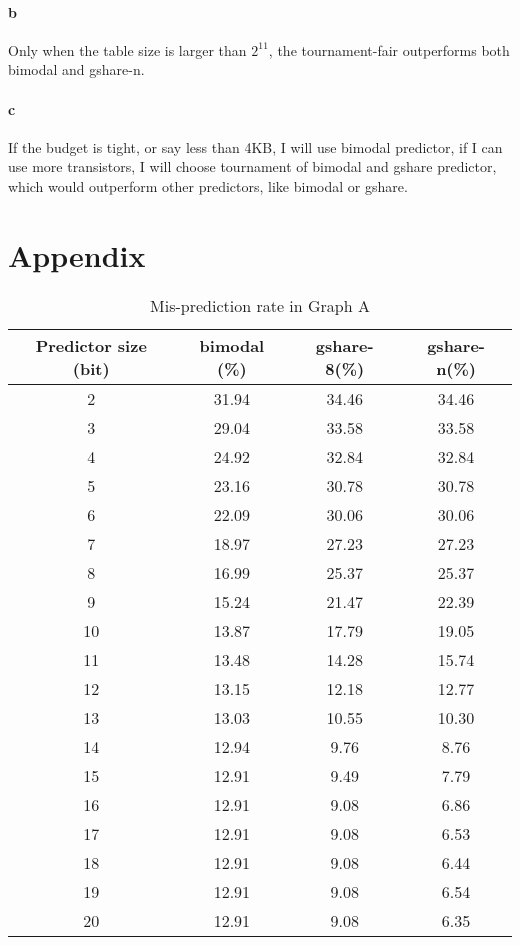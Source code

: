 \documentclass[12pt,letterpaper]{article}
\begin{document}
\paragraph*{b}
Only when the table size is larger than $2^{11}$, the tournament-fair 
outperforms both bimodal and gshare-n.

\paragraph*{c}
If the budget is tight, or say less than 4KB, I will use bimodal predictor, if
I can use more transistors, I will choose tournament of bimodal and gshare
predictor, which would outperform other predictors, like bimodal or gshare.


\clearpage
\section*{Appendix}

\begin{table}[!ht]
\caption{Mis-prediction rate in Graph A}
\centering
\begin{tabular}{|c|c|c|c|}
\hline 
Predictor size (bit) & bimodal (\%) & gshare-8(\%) & gshare-n(\%) \\ 
\hline 
2 & 31.94 & 34.46 & 34.46 \\ 
\hline 
3 & 29.04 & 33.58 & 33.58 \\ 
\hline 
4 & 24.92 & 32.84 & 32.84 \\ 
\hline 
5 & 23.16 & 30.78 & 30.78 \\ 
\hline 
6 & 22.09 & 30.06 & 30.06 \\ 
\hline 
7 & 18.97 & 27.23 & 27.23 \\ 
\hline 
8 & 16.99 & 25.37 & 25.37 \\ 
\hline 
9 & 15.24 & 21.47 & 22.39 \\ 
\hline 
10 & 13.87 & 17.79 & 19.05 \\ 
\hline 
11 & 13.48 & 14.28 & 15.74 \\ 
\hline 
12 & 13.15 & 12.18 & 12.77 \\ 
\hline 
13 & 13.03 & 10.55 & 10.30 \\ 
\hline 
14 & 12.94 & 9.76 & 8.76 \\ 
\hline 
15 & 12.91 & 9.49 & 7.79 \\ 
\hline 
16 & 12.91 & 9.08 & 6.86 \\ 
\hline 
17 & 12.91 & 9.08 & 6.53 \\ 
\hline 
18 & 12.91 & 9.08 & 6.44 \\ 
\hline 
19 & 12.91 & 9.08 & 6.54 \\ 
\hline 
20 & 12.91 & 9.08 & 6.35 \\ 
\hline 
\end{tabular} 
\end{table}
\end{document}
